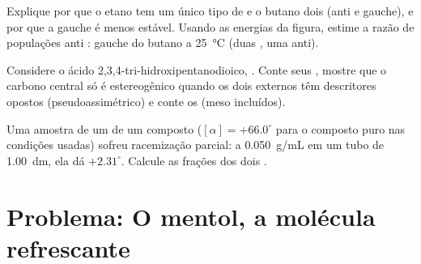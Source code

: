 \begin{exercise}[$\star\star\star$]\label{exo:b1:stereochemistry-in-depth:10}
Explique por que o etano tem um único tipo de  e o
butano dois (anti e gauche), e por que a gauche é menos estável. Usando
as energias da figura, estime a razão de populações anti : gauche do
butano a \qty{25}{\celsius} (duas , uma anti).
\end{exercise}

\begin{exercise}[$\star\star\star$]\label{exo:b1:stereochemistry-in-depth:11}
Considere o ácido 2,3,4-tri-hidroxipentanodioico,
. Conte seus ,
mostre que o carbono central só é estereogênico quando os dois externos
têm descritores opostos (pseudoassimétrico) e conte os 
(meso incluídos).
\end{exercise}

\begin{exercise}[$\star\star\star$]\label{exo:b1:stereochemistry-in-depth:12}
Uma amostra de um  de um composto ($[\alpha] = +66.0^\circ$
para o composto puro nas condições usadas) sofreu racemização parcial: a
\qty{0.050}{g/mL} em um tubo de \qty{1.00}{dm}, ela dá $+2.31^\circ$.
Calcule as frações dos dois .
\end{exercise}

\section{Problema: O mentol, a molécula refrescante}

